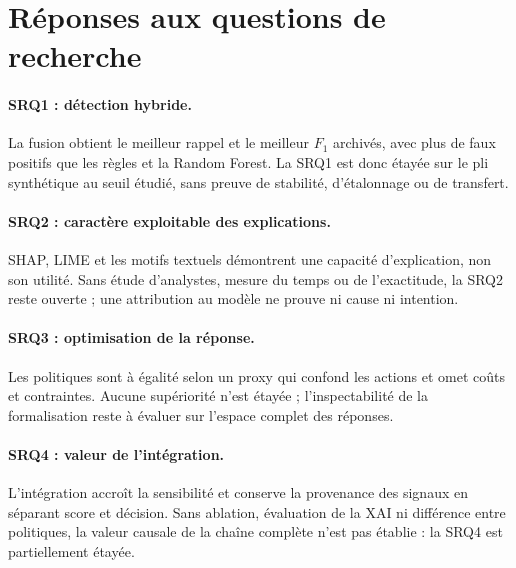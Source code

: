 \documentclass[11pt,a4paper,oneside]{report}
\theoremstyle{definition}
\theoremstyle{plain}
\begin{document}
\section{Réponses aux questions de recherche}
\label{sec:validation-rqs}

\paragraph{SRQ1 : détection hybride.}
La fusion obtient le meilleur rappel et le meilleur \(F_1\) archivés, avec
plus de faux positifs que les règles et la Random Forest. La SRQ1 est donc
étayée sur le pli synthétique au seuil étudié, sans preuve de stabilité,
d'étalonnage ou de transfert.

\paragraph{SRQ2 : caractère exploitable des explications.}
SHAP, LIME et les motifs textuels démontrent une capacité d'explication, non
son utilité. Sans étude d'analystes, mesure du temps ou de l'exactitude, la SRQ2
reste ouverte ; une attribution au modèle ne prouve ni cause ni intention.

\paragraph{SRQ3 : optimisation de la réponse.}
Les politiques sont à égalité selon un proxy qui confond les actions et omet
coûts et contraintes. Aucune supériorité n'est étayée ; l'inspectabilité de la
formalisation reste à évaluer sur l'espace complet des réponses.

\paragraph{SRQ4 : valeur de l'intégration.}
L'intégration accroît la sensibilité et conserve la provenance des signaux en
séparant score et décision. Sans ablation, évaluation de la XAI ni différence
entre politiques, la valeur causale de la chaîne complète n'est pas établie :
la SRQ4 est partiellement étayée.
\end{document}
